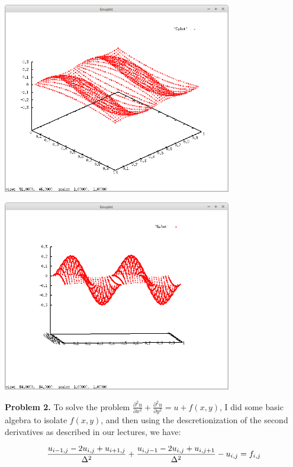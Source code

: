 \documentclass{article}
\begin{document}
	\begin{center}
		\includegraphics[width=0.75\textwidth]{pr1_2.png}
	\end{center}
	
	\begin{center}
		\includegraphics[width=0.75\textwidth]{pr1_3.png}
	\end{center}
	
	\newpage
	\textbf{Problem 2.} To solve the problem $\frac{\partial^2u}{\partial x^2}+\frac{\partial^2u}{\partial y^2}=u+f(x,y)$, I did some basic algebra to isolate $f(x,y)$, and then using the descretionization of the second derivatives as described in our lectures, we have:
	
	\begin{equation*}
		\frac{u_{i-1,j}-2u_{i,j}+u_{i+1,j}}{\Delta^2}+\frac{u_{i,j-1}-2u_{i,j}+u_{i,j+1}}{\Delta^2}-u_{i,j}=f_{i,j}\\
	\end{equation*}
	
\end{document}

